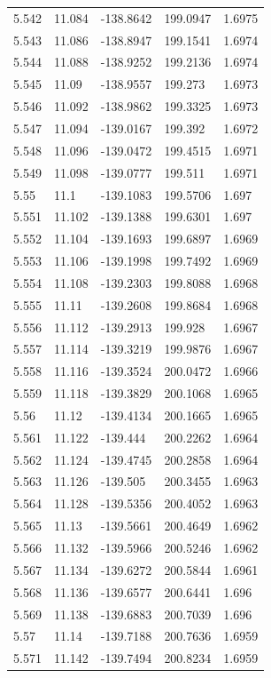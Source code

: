 \begin{tabular}{lllll}
5.542 & 11.084 & -138.8642 & 199.0947 & 1.6975 \\
5.543 & 11.086 & -138.8947 & 199.1541 & 1.6974 \\
5.544 & 11.088 & -138.9252 & 199.2136 & 1.6974 \\
5.545 & 11.09 & -138.9557 & 199.273 & 1.6973 \\
5.546 & 11.092 & -138.9862 & 199.3325 & 1.6973 \\
5.547 & 11.094 & -139.0167 & 199.392 & 1.6972 \\
5.548 & 11.096 & -139.0472 & 199.4515 & 1.6971 \\
5.549 & 11.098 & -139.0777 & 199.511 & 1.6971 \\
5.55 & 11.1 & -139.1083 & 199.5706 & 1.697 \\
5.551 & 11.102 & -139.1388 & 199.6301 & 1.697 \\
5.552 & 11.104 & -139.1693 & 199.6897 & 1.6969 \\
5.553 & 11.106 & -139.1998 & 199.7492 & 1.6969 \\
5.554 & 11.108 & -139.2303 & 199.8088 & 1.6968 \\
5.555 & 11.11 & -139.2608 & 199.8684 & 1.6968 \\
5.556 & 11.112 & -139.2913 & 199.928 & 1.6967 \\
5.557 & 11.114 & -139.3219 & 199.9876 & 1.6967 \\
5.558 & 11.116 & -139.3524 & 200.0472 & 1.6966 \\
5.559 & 11.118 & -139.3829 & 200.1068 & 1.6965 \\
5.56 & 11.12 & -139.4134 & 200.1665 & 1.6965 \\
5.561 & 11.122 & -139.444 & 200.2262 & 1.6964 \\
5.562 & 11.124 & -139.4745 & 200.2858 & 1.6964 \\
5.563 & 11.126 & -139.505 & 200.3455 & 1.6963 \\
5.564 & 11.128 & -139.5356 & 200.4052 & 1.6963 \\
5.565 & 11.13 & -139.5661 & 200.4649 & 1.6962 \\
5.566 & 11.132 & -139.5966 & 200.5246 & 1.6962 \\
5.567 & 11.134 & -139.6272 & 200.5844 & 1.6961 \\
5.568 & 11.136 & -139.6577 & 200.6441 & 1.696 \\
5.569 & 11.138 & -139.6883 & 200.7039 & 1.696 \\
5.57 & 11.14 & -139.7188 & 200.7636 & 1.6959 \\
5.571 & 11.142 & -139.7494 & 200.8234 & 1.6959 \\

\end{tabular}

